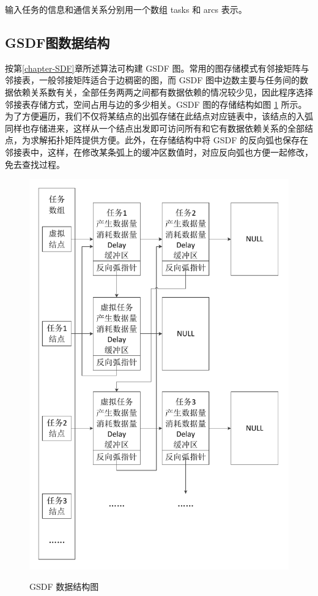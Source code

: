 输入任务的信息和通信关系分别用一个数组 tasks 和 arcs 表示。

\subsection{GSDF图数据结构}

按第\ref{chapter-SDF}章所述算法可构建 GSDF 图。常用的图存储模式有邻接矩阵与邻接表，一般邻接矩阵适合于边稠密的图，而 GSDF 图中边数主要与任务间的数据依赖关系数有关，全部任务两两之间都有数据依赖的情况较少见，因此程序选择邻接表存储方式，空间占用与边的多少相关。GSDF 图的存储结构如图 \ref{PROG-fig-GSDF-structure} 所示。
为了方便遍历，我们不仅将某结点的出弧存储在此结点对应链表中，该结点的入弧同样也存储进来，这样从一个结点出发即可访问所有和它有数据依赖关系的全部结点，为求解拓扑矩阵提供方便。此外，在存储结构中将 GSDF 的反向弧也保存在邻接表中，这样，在修改某条弧上的缓冲区数值时，对应反向弧也方便一起修改，免去查找过程。

\begin{figure}[!hbt]
  \centering
  \includegraphics[height=63ex]{figure/PROG-fig-GSDF-structure.pdf}\\
  \caption{GSDF 数据结构图}\label{PROG-fig-GSDF-structure}
\end{figure}


%
%

